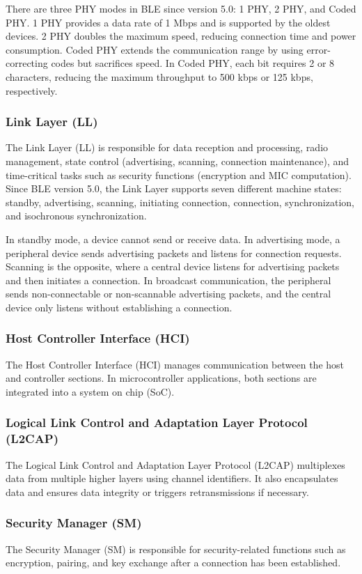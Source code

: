 \documentclass{Configuration_Files/PoliMi3i_thesis}
\begin{document}
There are three PHY modes in BLE since version 5.0: 1 PHY, 2 PHY, and Coded PHY. 1 PHY provides a data rate of 1 Mbps and is supported by the oldest devices. 2 PHY doubles the maximum speed, reducing connection time and power consumption. Coded PHY extends the communication range by using error-correcting codes but sacrifices speed. In Coded PHY, each bit requires 2 or 8 characters, reducing the maximum throughput to 500 kbps or 125 kbps, respectively.

\subsubsection{Link Layer (LL)}
The Link Layer (LL) is responsible for data reception and processing, radio management, state control (advertising, scanning, connection maintenance), and time-critical tasks such as security functions (encryption and MIC computation). Since BLE version 5.0, the Link Layer supports seven different machine states: standby, advertising, scanning, initiating connection, connection, synchronization, and isochronous synchronization.

In standby mode, a device cannot send or receive data. In advertising mode, a peripheral device sends advertising packets and listens for connection requests. Scanning is the opposite, where a central device listens for advertising packets and then initiates a connection. In broadcast communication, the peripheral sends non-connectable or non-scannable advertising packets, and the central device only listens without establishing a connection.

\subsubsection{Host Controller Interface (HCI)}
The Host Controller Interface (HCI) manages communication between the host and controller sections. In microcontroller applications, both sections are integrated into a system on chip (SoC).

\subsubsection{Logical Link Control and Adaptation Layer Protocol (L2CAP)}
The Logical Link Control and Adaptation Layer Protocol (L2CAP) multiplexes data from multiple higher layers using channel identifiers. It also encapsulates data and ensures data integrity or triggers retransmissions if necessary.

\subsubsection{Security Manager (SM)}
The Security Manager (SM) is responsible for security-related functions such as encryption, pairing, and key exchange after a connection has been established.
\end{document}
